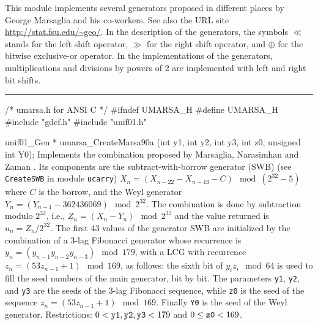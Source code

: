 
This module implements several generators proposed in different places
by George Marsaglia and his  co-workers.
See also the URL site \url{http://stat.fsu.edu/~geo/}.
In the description of the generators, the symbols $\ll$ stands for
 the left shift operator, $\gg$ for the right shift operator,
 and  $\oplus$ for the bitwise exclusive-or operator. In the
implementations of the generators, multiplications and divisions by powers
of 2 are implemented with left and right bit shifts.

\def\OP{\mathop {S}\nolimits}

\bigskip
\hrule
\code\hide
/* umarsa.h for ANSI C */
#ifndef UMARSA_H
#define UMARSA_H
\endhide
#include "gdef.h"
#include "unif01.h"


unif01_Gen * umarsa_CreateMarsa90a (int y1, int y2, int y3, int z0,
                                    unsigned int Y0);
\endcode
  \tab Implements the combination proposed by Marsaglia, Narasimhan and
   Zaman \cite{rMAR90a}. Its components are the subtract-with-borrow
%
   generator (SWB) (see {\tt CreateSWB} in module {\tt ucarry})
   $X_n = (X_{n-22} - X_{n-43} - C) \mod (2^{32}-5)$
   where $C$ is the borrow, and the Weyl generator
   $Y_n = (Y_{n-1} - 362436069) \mod 2^{32}$.
   The combination is done by subtraction modulo $2^{32}$, i.e.,
   $Z_n = (X_n - Y_n) \mod 2^{32}$ and the value returned is
   $u_n = Z_n/2^{32}$.
   The first 43 values of the generator SWB are initialized by the
   combination of a 3-lag Fibonacci generator whose recurrence is
   $y_n = (y_{n-1}y_{n-2}y_{n-3}) \mod 179$, with a LCG with recurrence
   $z_n = (53z_{n-1} + 1) \mod 169$, as
   follows: the sixth bit of $y_i z_i \mod 64$ is used to fill the seed
   numbers of the main generator, bit by bit.
   The parameters {\tt y1}, {\tt y2},  and {\tt y3} are the seeds of the
    3-lag Fibonacci sequence, while {\tt z0} is the seed of the
   sequence $z_{n} = (53 z_{n-1} + 1)\mod 169$.  Finally {\tt Y0}
   is the seed of the  Weyl generator.  Restrictions: $0 < {\tt y1},
   {\tt y2}, {\tt y3} < 179$ and $0 \le {\tt z0} < 169$.
  \endtab
\code


